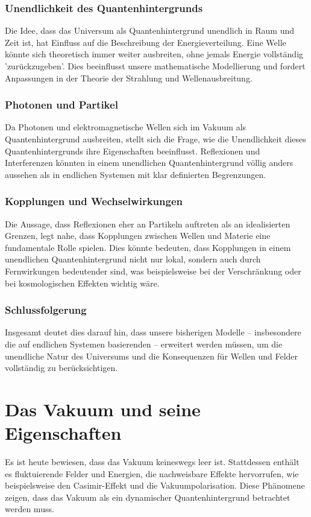 \documentclass[12pt,a4paper]{article}
\begin{document}
	\subsubsection{Unendlichkeit des Quantenhintergrunds}
	Die Idee, dass das Universum als Quantenhintergrund unendlich in Raum und Zeit ist, hat Einfluss auf die Beschreibung der Energieverteilung. Eine Welle könnte sich theoretisch immer weiter ausbreiten, ohne jemals Energie vollständig 'zurückzugeben'. Dies beeinflusst unsere mathematische Modellierung und fordert Anpassungen in der Theorie der Strahlung und Wellenausbreitung.
	
	\subsubsection{Photonen und Partikel}
	Da Photonen und elektromagnetische Wellen sich im Vakuum als Quantenhintergrund ausbreiten, stellt sich die Frage, wie die Unendlichkeit dieses Quantenhintergrunds ihre Eigenschaften beeinflusst. Reflexionen und Interferenzen könnten in einem unendlichen Quantenhintergrund völlig anders aussehen als in endlichen Systemen mit klar definierten Begrenzungen.
	
	\subsubsection{Kopplungen und Wechselwirkungen}
	Die Aussage, dass Reflexionen eher an Partikeln auftreten als an idealisierten Grenzen, legt nahe, dass Kopplungen zwischen Wellen und Materie eine fundamentale Rolle spielen. Dies könnte bedeuten, dass Kopplungen in einem unendlichen Quantenhintergrund nicht nur lokal, sondern auch durch Fernwirkungen bedeutender sind, was beispielsweise bei der Verschränkung oder bei kosmologischen Effekten wichtig wäre.
	
	\subsubsection{Schlussfolgerung}
	Insgesamt deutet dies darauf hin, dass unsere bisherigen Modelle – insbesondere die auf endlichen Systemen basierenden – erweitert werden müssen, um die unendliche Natur des Universums und die Konsequenzen für Wellen und Felder vollständig zu berücksichtigen.
	

\section{Das Vakuum und seine Eigenschaften}
Es ist heute bewiesen, dass das Vakuum keineswegs leer ist. Stattdessen enthält es fluktuierende Felder und Energien, die nachweisbare Effekte hervorrufen, wie beispielsweise den Casimir-Effekt und die Vakuumpolarisation. Diese Phänomene zeigen, dass das Vakuum als ein dynamischer Quantenhintergrund betrachtet werden muss.
\end{document}
